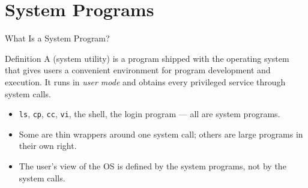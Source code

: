 \documentclass[aspectratio=169]{beamer}
\begin{document}

\section{System Programs}

\begin{frame}{What Is a System Program?}
  \begin{block}{Definition}
    A  (system utility) is a program shipped with the
    operating system that gives users a convenient environment for program
    development and execution. It runs in \emph{user mode} and obtains every
    privileged service through system calls.
  \end{block}
  \begin{itemize}
    \item \texttt{ls}, \texttt{cp}, \texttt{cc}, \texttt{vi}, the shell, the
      login program --- all are system programs.
    \item Some are thin wrappers around one system call; others are large
      programs in their own right.
    \item The user's view of the OS is defined by the system programs, not by
      the system calls.
  \end{itemize}
\end{frame}
\end{document}
